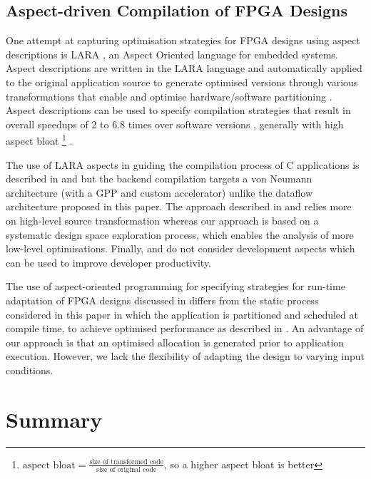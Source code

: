 \subsection{Aspect-driven Compilation of FPGA Designs}

One attempt at capturing optimisation strategies for FPGA designs
 using aspect descriptions is LARA
 \cite{Cardoso:Carvalho:Cutinho:Luk:Nobre:Diniz:Petrov:2012,
   Cardoso:Carvalho:Teixeira:Diniz:Goncalves:Petrov:2012}, an Aspect
 Oriented language for embedded systems. Aspect descriptions are
 written in the LARA language and automatically applied to the
 original application source to generate optimised versions through
 various transformations that enable and optimise hardware/software
 partitioning \cite{Lam:Coutinho:Luk:2008}. Aspect descriptions can be
 used to specify compilation strategies that result in overall
 speedups of 2 to 6.8 times over software versions
 \cite{Cardoso:Teixeira:Alves:Nobre:Diniz:Cutinho:Luk:2012}, generally
 with high aspect bloat \footnote{ $\text{aspect bloat} =
   \frac{\text{size of transformed code}}{\text{size of original
       code}}$, so a higher aspect bloat is better}
 \cite{Cardoso:Carvalho:Cutinho:Luk:Nobre:Diniz:Petrov:2012}.

The use of LARA aspects in guiding the compilation process of C
applications is described in
\cite{Cardoso:Teixeira:Alves:Nobre:Diniz:Cutinho:Luk:2012} and
\cite{cardoso2011new} but the backend compilation targets a von
Neumann architecture (with a GPP and custom accelerator) unlike the
dataflow architecture proposed in this paper. The approach described
in \cite{Cardoso:Teixeira:Alves:Nobre:Diniz:Cutinho:Luk:2012} and
\cite{cardoso2011new} relies more on high-level source transformation
whereas our approach is based on a systematic design space exploration
process, which enables the analysis of more low-level
optimisations. Finally,
\cite{Cardoso:Teixeira:Alves:Nobre:Diniz:Cutinho:Luk:2012} and
\cite{cardoso2011new} do not consider development aspects which can be
used to improve developer productivity.


The use of aspect-oriented programming for specifying strategies for
run-time adaptation of FPGA designs discussed in \cite{6322875}
differs from the static process considered in this paper in which the
application is partitioned and scheduled at compile time, to achieve
optimised performance as described in
\cite{Xinyu:Qiwei:Luk:Qiang:Pell:2012}. An advantage of our approach
is that an optimised allocation is generated prior to application
execution. However, we lack the flexibility of adapting the design to
varying input conditions.

\section{Summary}
